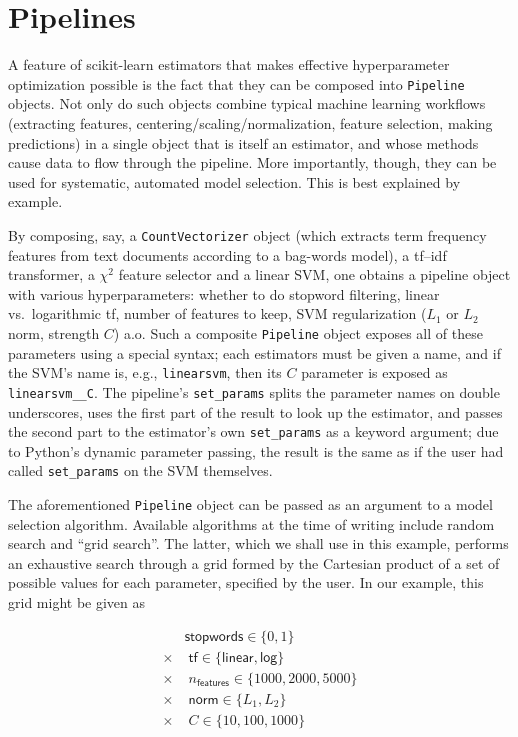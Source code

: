 \documentclass[a4paper,twocolumn]{article}
\begin{document}
\section{Pipelines}

A feature of scikit-learn estimators
that makes effective hyperparameter optimization possible
is the fact that they can be composed into \texttt{Pipeline} objects.
Not only do such objects combine typical machine learning workflows
(extracting features, centering/scaling/normalization,
feature selection, making predictions)
in a single object that is itself an estimator,
and whose methods cause data to flow through the pipeline.
More importantly, though, they can be used for
systematic, automated model selection.
This is best explained by example.

By composing, say, a \texttt{CountVectorizer} object
(which extracts term frequency features from text documents
according to a bag-words model),
a \textsf{tf--idf} transformer, a $\chi^2$ feature selector and a linear SVM,
one obtains a pipeline object with various hyperparameters:
whether to do stopword filtering,
linear vs.\ logarithmic \textsf{tf}, number of features to keep,
SVM regularization ($L_1$ or $L_2$ norm, strength $C$) a.o.
Such a composite \texttt{Pipeline} object
exposes all of these parameters using a special syntax;
each estimators must be given a name,
and if the SVM's name is, e.g., \texttt{linearsvm},
then its $C$ parameter is exposed as \texttt{linearsvm\_\_C}.
The pipeline's \texttt{set\_params} splits the parameter names
on double underscores, uses the first part of the result
to look up the estimator,
and passes the second part to the estimator's own \texttt{set\_params}
as a keyword argument; due to Python's dynamic parameter passing,
the result is the same as if the user had called \texttt{set\_params}
on the SVM themselves.

The aforementioned \texttt{Pipeline} object
can be passed as an argument to a model selection algorithm.
Available algorithms at the time of writing include random search
\citep{bergstra2012} and ``grid search''.
The latter, which we shall use in this example,
performs an exhaustive search through a grid formed by the Cartesian product
of a set of possible values for each parameter, specified by the user.
In our example, this grid might be given as

\begin{align*}
         & \textsf{stopwords} \in \{0, 1\}                      \\
  \times & \; \textsf{tf} \in \{\textsf{linear}, \textsf{log}\} \\
  \times & \; n_\textsf{features} \in \{1000, 2000, 5000\}      \\
  \times & \; \textsf{norm} \in \{L_1, L_2\}                    \\
  \times & \; C \in \{10, 100, 1000\}
\end{align*}
\end{document}
